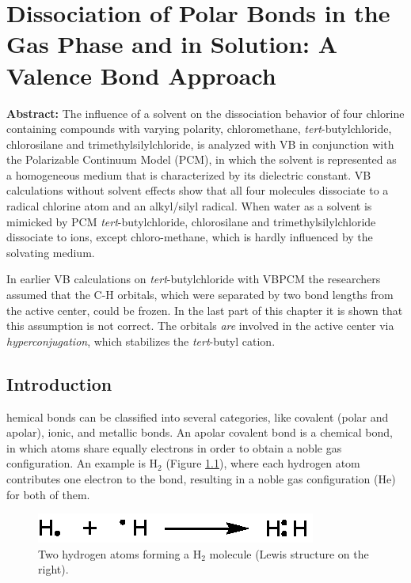 \chapter{Dissociation of Polar Bonds in the Gas Phase and in Solution: A Valence Bond Approach}
\label{chap_dissociation}



\noindent\textbf{Abstract:} The influence of a solvent on the dissociation behavior of four chlorine containing compounds with varying polarity, chloromethane, \textit{tert}-butylchloride, chlorosilane and trimethylsilylchloride, is analyzed with VB in conjunction with the Polarizable Continuum Model (PCM), in which the solvent is represented as a homogeneous medium that is characterized by its dielectric constant. VB calculations without solvent effects show that all four molecules dissociate to a radical chlorine atom and an alkyl/silyl radical. When water as a solvent is mimicked by PCM \textit{tert}-butylchloride, chlorosilane and trimethylsilylchloride dissociate to ions, except chloro-methane, which is hardly influenced by the solvating medium.

In earlier VB calculations on  \textit{tert}-butylchloride with VBPCM the researchers assumed that the C-H orbitals, which were separated by two bond lengths from the active center, could be frozen. In the last part of this chapter it is shown that this assumption is not correct. The orbitals \textit{are} involved in the active center via \textit{hyperconjugation}, which stabilizes the \textit{tert}-butyl cation. 

\clearpage

\section{Introduction}

\lettrine{}{}hemical bonds can be classified into several categories, like covalent (polar and apolar), ionic, and metallic bonds. An apolar covalent bond is a chemical bond, in which atoms share equally electrons in order to obtain a noble gas configuration. An example is H$_2$ (Figure \ref{ch3.fig.h_twee}), where each hydrogen atom contributes one electron to the bond, resulting in a noble gas configuration (He) for both of them.
\begin{figure}[ht]
\center
\includegraphics{dissociation/figures/h_twee.eps}
\caption{Two hydrogen atoms forming a H$_2$ molecule (Lewis structure on the right).}
\label{ch3.fig.h_twee} 
\end{figure}

